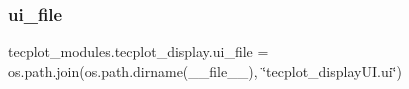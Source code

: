 \hypertarget{namespacetecplot__modules_1_1tecplot__display_a6eb7c910a295eb89ac32ad8b00d5bd2e}{}\label{namespacetecplot__modules_1_1tecplot__display_a6eb7c910a295eb89ac32ad8b00d5bd2e} 
\subsubsection{\texorpdfstring{ui\+\_\+file}{ui\_file}}
{\footnotesize\ttfamily tecplot\+\_\+modules.\+tecplot\+\_\+display.\+ui\+\_\+file = os.\+path.\+join(os.\+path.\+dirname(\+\_\+\+\_\+file\+\_\+\+\_\+), \char`\"{}tecplot\+\_\+display\+U\+I.\+ui\char`\"{})}

